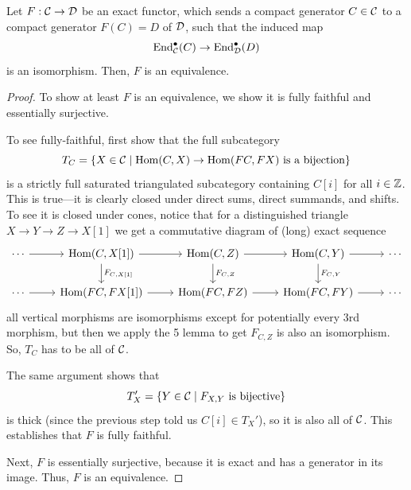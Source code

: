 \documentclass[12pt]{article}
\begin{document}
\begin{lem}
    Let $F:\mathcal{C} \to \mathcal{D}$ be an exact functor, which sends a compact generator $C\in \mathcal{C}$ to a compact generator $F(C)=D$ of $\mathcal{D}$, such that the induced map
    \[\operatorname{End}_{\mathcal{C}}^\bullet(C) \to \operatorname{End}_{\mathcal{D}}^\bullet(D)\]
    is an isomorphism. Then, $F$ is an equivalence.
\end{lem}
\begin{proof}
    To show at least $F$ is an equivalence, we show it is fully faithful and essentially surjective.
    
    To see fully-faithful, first show that the full subcategory
    \[T_C = \{X\in \mathcal{C} \mid \text{$\mathrm{Hom}(C,X) \to \mathrm{Hom}(FC,FX)$ is a bijection}\}\]
    is a strictly full saturated triangulated subcategory containing $C[i]$ for all $i\in \mathbb{Z}$. This is true---it is clearly closed under direct sums, direct summands, and shifts. To see it is closed under cones, notice that for a distinguished triangle $X\to Y\to Z \to X[1]$ we get a commutative diagram of (long) exact sequence
    \[\begin{tikzcd}
        \cdots \rar & \Hom(C,X[1]) \rar \dar["F_{C{,}X[1]}"] & \Hom(C,Z) \rar \dar["F_{C{,}Z}"] & \Hom(C,Y) \rar \dar["F_{C{,}Y}"] & \cdots\\
        \cdots \rar & \Hom(FC,FX[1]) \rar & \Hom(FC,FZ) \rar & \Hom(FC,FY) \rar & \cdots
    \end{tikzcd}\]
    all vertical morphisms are isomorphisms except for potentially every 3rd morphism, but then we apply the 5 lemma to get $F_{C,Z}$ is also an isomorphism. So, $T_C$ has to be all of $\mathcal{C}$.

    The same argument shows that
    \[T_X' = \{Y\in \mathcal{C} \mid F_{X,Y} \text{ is bijective}\}\]
    is thick (since the previous step told us $C[i]\in T_X'$), so it is also all of $\mathcal{C}$. This establishes that $F$ is fully faithful.

    Next, $F$ is essentially surjective, because it is exact and has a generator in its image. Thus, $F$ is an equivalence.
\end{proof}
\end{document}
